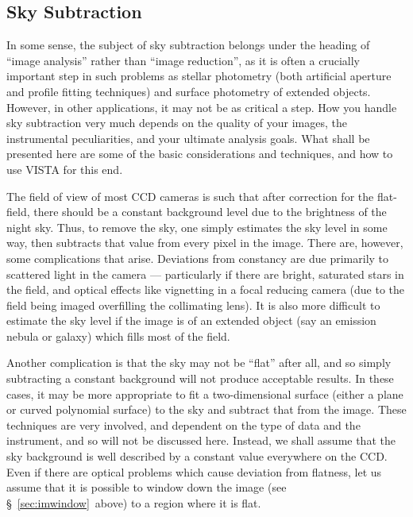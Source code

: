 
\subsection{Sky Subtraction}
\label{sec:imskysub}
In some sense, the subject of sky subtraction belongs under the heading of
``image analysis'' rather than ``image reduction'', as it is often a crucially
important step in such problems as stellar photometry (both artificial aperture
and profile fitting techniques) and surface photometry of extended objects. 
However, in other applications, it may not be as critical a step.  How you
handle sky subtraction very much depends on the quality of your images, the
instrumental peculiarities, and your ultimate analysis goals.  What shall be
presented here are some of the basic considerations and techniques, and how to
use VISTA for this end. 

The field of view of most CCD cameras is such that after correction for the
flat-field, there should be a constant background level due to the brightness
of the night sky.  Thus, to remove the sky, one simply estimates the sky level
in some way, then subtracts that value from every pixel in the image. There
are, however, some complications that arise.  Deviations from constancy are
due primarily to scattered light in the camera --- particularly if there are
bright, saturated stars in the field, and optical effects like vignetting in a
focal reducing camera (due to the field being imaged overfilling the
collimating lens).  It is also more difficult to estimate the sky level if the
image is of an extended object (say an emission nebula or galaxy) which fills
most of the field.  

Another complication is that the sky may not be ``flat'' after all, and so
simply subtracting a constant background will not produce acceptable results. 
In these cases, it may be more appropriate to fit a two-dimensional surface
(either a plane or curved polynomial surface) to the sky and subtract that
from the image.  These techniques are very involved, and dependent on the type
of data and the instrument, and so will not be discussed here.  Instead, we
shall assume that the sky background is well described by a constant value
everywhere on the CCD.  Even if there are optical problems which cause
deviation from flatness, let us assume that it is possible to window down the
image (see \S~\ref{sec:imwindow}\ above) to a region where it is flat. 


